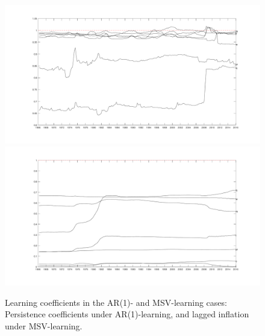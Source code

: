 \documentclass[12pt,reqno]{article}
\numberwithin{equation}{section}
\begin{document}
\begin{figure}[H]
\label{sw_learning_2}
\caption{Learning coefficients in the AR(1)- and MSV-learning cases: Persistence coefficients under AR(1)-learning, and lagged inflation under MSV-learning.} 
\vspace{5 mm}

\includegraphics[scale=0.5]{sw_ar1_learning_betas.pdf}\\
\includegraphics[scale=0.5]{sw_msv_learning_laggedInfl.pdf}\\
\end{figure}
\end{document}
